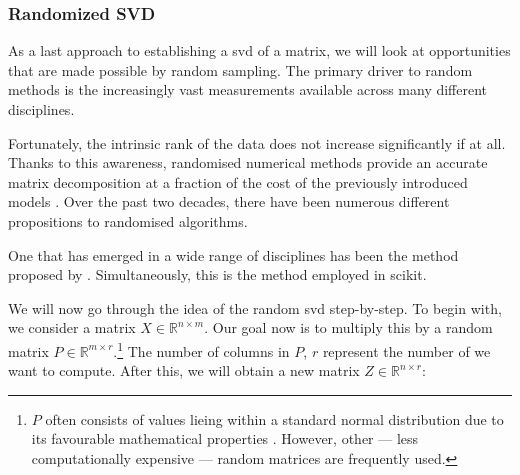 \vspace*{20mm}


\clearpage


\subsubsection{Randomized SVD}


As a last approach to establishing a \acrlong{svd} of a matrix, we will look at opportunities that are made possible by random sampling. 
The primary driver to random methods is the increasingly vast measurements available across many different disciplines.

Fortunately, the intrinsic rank of the data does not increase significantly if at all.
Thanks to this awareness, randomised numerical methods provide an accurate matrix decomposition at a fraction of the cost of the previously introduced models \cite{brunton2019data}.
Over the past two decades, there have been numerous different propositions to randomised algorithms.
\medskip

One that has emerged in a wide range of disciplines has been the method proposed by .
Simultaneously, this is the method employed in \gls{scikit}.
\bigskip


We will now go through the idea of the random \gls{svd} step-by-step.
To begin with, we consider a matrix $X \in \mathbb{R}^{n \times m}$.
Our goal now is to multiply this by a random matrix $P \in \mathbb{R}^{m \times r}$.\footnote{%
$P$ often consists of values lieing within a standard normal distribution due to its favourable mathematical properties \cite{brunton2019data}. %
However, other --- less computationally expensive --- random matrices are frequently used.%
}
The number of columns in $P$, $r$ represent the number of  we want to compute.
After this, we will obtain a new matrix $Z \in \mathbb{R}^{n \times r}$:

